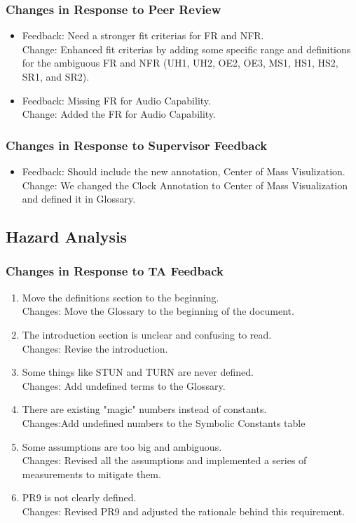 \documentclass{article}
\begin{document}
\subsubsection{Changes in Response to Peer Review}
\begin{itemize}
        \item Feedback: Need a stronger fit criterias for FR and NFR.\\
                Change: Enhanced fit criterias by adding some specific range and definitions for the ambiguous FR and NFR 
                (UH1, UH2, OE2, OE3, MS1, HS1, HS2, SR1, and SR2).
        \item Feedback: Missing FR for Audio Capability.\\
                Change: Added the FR for Audio Capability.
\end{itemize}
\subsubsection{Changes in Response to Supervisor Feedback}
\begin{itemize}
        \item Feedback: Should include the new annotation, Center of Mass Visulization.\\
                Change: We changed the Clock Annotation to Center of Mass Visualization and defined it in Glossary.
\end{itemize}
\subsection{Hazard Analysis}
\subsubsection{Changes in Response to TA Feedback}
\begin{enumerate}
        \item Move the definitions section to the beginning.\\
                Changes: Move the Glossary to the beginning of the document.
        \item The introduction section is unclear and confusing to read.\\
                Changes: Revise the introduction.
        \item Some things like STUN and TURN are never defined.\\
                Changes: Add undefined terms to the Glossary.
        \item There are existing "magic" numbers instead of constants.\\
                Changes:Add undefined numbers to the Symbolic Constants table
        \item Some assumptions are too big and ambiguous.\\
                Changes: Revised all the assumptions and implemented a series of measurements to mitigate them.
        \item PR9 is not clearly defined.\\
                Changes: Revised PR9 and adjusted the rationale behind this requirement.
\end{enumerate}
\end{document}

